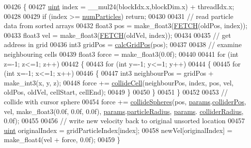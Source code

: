 \begin{DoxyCode}
00426 \{
00427     \hyperlink{particles__kernel_8cuh_a91ad9478d81a7aaf2593e8d9c3d06a14}{uint} index = \_\_mul24(blockIdx.x,blockDim.x) + threadIdx.x;
00428 
00429     \textcolor{keywordflow}{if} (index >= \hyperlink{particles_8cpp_a05b8a90212054a3eb1a036ae0c269596}{numParticles}) \textcolor{keywordflow}{return};
00430 
00431     \textcolor{comment}{// read particle data from sorted arrays}
00432     float3 pos = make\_float3(\hyperlink{particles__kernel_8cuh_a12269d678a65f18889c2a7e98c756457}{FETCH}(oldPos, index));
00433     float3 vel = make\_float3(\hyperlink{particles__kernel_8cuh_a12269d678a65f18889c2a7e98c756457}{FETCH}(oldVel, index));
00434 
00435     \textcolor{comment}{// get address in grid}
00436     int3 gridPos = \hyperlink{particles__kernel__impl_8cuh_a63d62750e6cbb8781c5ff252fc13c1fd}{calcGridPos}(pos);
00437 
00438     \textcolor{comment}{// examine neighbouring cells}
00439     float3 force = make\_float3(0.0f);
00440 
00441     \textcolor{keywordflow}{for} (\textcolor{keywordtype}{int} z=-1; z<=1; z++)
00442     \{
00443         \textcolor{keywordflow}{for} (\textcolor{keywordtype}{int} y=-1; y<=1; y++)
00444         \{
00445             \textcolor{keywordflow}{for} (\textcolor{keywordtype}{int} x=-1; x<=1; x++)
00446             \{
00447                 int3 neighbourPos = gridPos + make\_int3(x, y, z);
00448                 force += \hyperlink{particles__kernel__impl_8cuh_a8e623e11d4ac873cfbe9d7c916326363}{collideCell}(neighbourPos, index, pos, vel, oldPos, oldVel, cellStart, 
      cellEnd);
00449             \}
00450         \}
00451     \}
00452 
00453     \textcolor{comment}{// collide with cursor sphere}
00454     force += \hyperlink{particles__kernel__impl_8cuh_a1d93cb067b16b4a472e9c1a08d9d8e68}{collideSpheres}(pos, \hyperlink{particles__kernel__impl_8cuh_a8db8938e28edd17862daf58651051bdc}{params}.\hyperlink{struct_sim_params_aa27be265020f137f0a9cfbc3f1d2d9f8}{colliderPos}, vel, make\_float3(0.0f, 
      0.0f, 0.0f), \hyperlink{particles__kernel__impl_8cuh_a8db8938e28edd17862daf58651051bdc}{params}.\hyperlink{struct_sim_params_a7e131c24e1020c44173deb0f57a8c4af}{particleRadius}, \hyperlink{particles__kernel__impl_8cuh_a8db8938e28edd17862daf58651051bdc}{params}.
      \hyperlink{struct_sim_params_a06ca2162f6f0aec08343db6ed8cd4478}{colliderRadius}, 0.0f);
00455 
00456     \textcolor{comment}{// write new velocity back to original unsorted location}
00457     \hyperlink{particles__kernel_8cuh_a91ad9478d81a7aaf2593e8d9c3d06a14}{uint} originalIndex = gridParticleIndex[index];
00458     newVel[originalIndex] = make\_float4(vel + force, 0.0f);
00459 \}
\end{DoxyCode}
